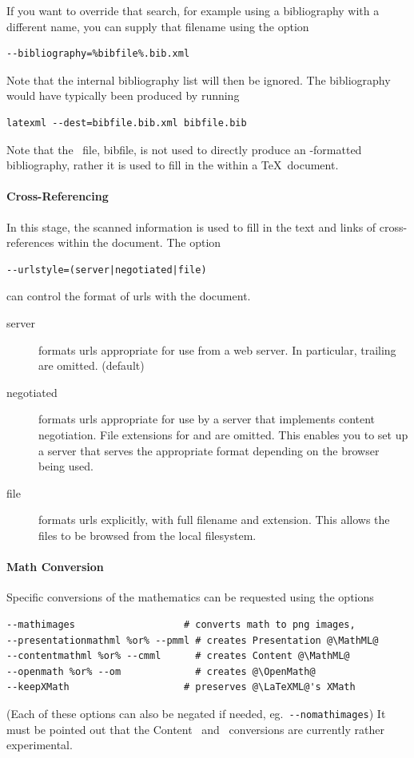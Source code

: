 \documentclass{book}
\newcommand{\shellcode}{\lstinline[style=shell]}
\begin{document}
If you want to override that search, for example using a bibliography
with a different name,  you can supply that filename using the option
\begin{lstlisting}[style=shell]
--bibliography=%bibfile%.bib.xml
\end{lstlisting}
Note that the internal bibliography list will then be ignored.
The bibliography would have typically been produced by running
\begin{lstlisting}[style=shell]
latexml --dest=bibfile.bib.xml bibfile.bib
\end{lstlisting}
Note that the \XML\ file, bibfile, is not used to directly produce
an \HTML-formatted bibliography, rather it is used to fill in
the \verb|| within a \TeX\ document.

\paragraph{Cross-Referencing}\label{usage.post.crossref}
In this stage, the scanned information is used to fill in the
text and links of cross-references within the document.
The option
\begin{lstlisting}[style=shell]
--urlstyle=(server|negotiated|file)
\end{lstlisting}
can control the format of urls with the document.
\begin{description}
  \item[server] formats urls appropriate for use from a web server.
    In particular, trailing  are omitted. (default)
  \item[negotiated] formats urls appropriate for use by a server
    that implements content negotiation. File extensions for 
    and  are omitted.  This enables you to set up a server
    that serves the appropriate format depending on the browser being used.
  \item[file] formats urls explicitly, with full filename and extension.
    This allows the files to be browsed from the local filesystem.
\end{description}

\paragraph{Math Conversion}\label{usage.post.math}
Specific conversions of the mathematics can be requested
using the options
\begin{lstlisting}[style=shell]
--mathimages                   # converts math to png images,
--presentationmathml %or% --pmml # creates Presentation @\MathML@
--contentmathml %or% --cmml      # creates Content @\MathML@
--openmath %or% --om             # creates @\OpenMath@
--keepXMath                    # preserves @\LaTeXML@'s XMath
\end{lstlisting}
(Each of these options can also be negated if needed, eg.~\shellcode{--nomathimages})
It must be pointed out that the Content \MathML\ and \OpenMath\
conversions are currently rather experimental.
\end{document}
